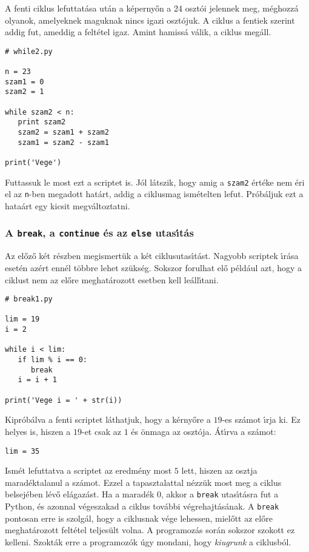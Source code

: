 \documentclass[12pt]{article}
\begin{document}
A fenti ciklus lefuttat\'asa ut\'an a k\'eperny\H{o}n a 24 oszt\'oi jelennek meg, m\'eghozz\'a olyanok, amelyeknek 
maguknak nincs igazi oszt\'ojuk. A ciklus a fentiek szerint addig fut, ameddig a felt\'etel igaz. Amint hamiss\'a 
v\'alik, a ciklus meg\'all. 

\begin{Verbatim}[fontsize=\small]
# while2.py

n = 23
szam1 = 0
szam2 = 1 

while szam2 < n:
   print szam2
   szam2 = szam1 + szam2
   szam1 = szam2 - szam1

print('Vege')
\end{Verbatim}

Futtassuk le most ezt a scriptet is. J\'ol l\'atszik, hogy amig a {\tt szam2} \'ert\'eke nem \'eri el az 
{\tt n}-ben megadott hat\'art, addig a ciklusmag ism\'etelten lefut. Pr\'ob\'aljuk ezt a hata\'art egy 
kicsit megv\'altoztatni.

\subsubsection{A {\tt break}, a {\tt continue} \'es az {\tt else} utas\'{\i}t\'as}

Az el\H{o}z\H{o} k\'et r\'eszben megismert\"uk a k\'et ciklusutas\'{\i}t\'ast. Nagyobb scriptek \'{\i}r\'asa 
eset\'en az\'ert enn\'el t\"obbre lehet sz\"uks\'eg. Sokszor forulhat el\H{o} p\'eld\'aul azt, hogy a 
ciklust nem az el\H{o}re meghat\'arozott esetben kell le\'all\'{\i}tani. 

\begin{Verbatim}[fontsize=\small]
# break1.py

lim = 19
i = 2

while i < lim:
   if lim % i == 0:
      break
   i = i + 1

print('Vege i = ' + str(i))
\end{Verbatim}

Kipr\'ob\'alva a fenti scriptet l\'athatjuk, hogy a k\'erny\H{o}re a $19$-es sz\'amot \'{\i}rja ki. Ez helyes 
is, hiszen a $19$-et csak az $1$ \'es \"onmaga az oszt\'oja. \'At\'{\i}rva a sz\'amot:

\begin{Verbatim}[fontsize=\small]
lim = 35
\end{Verbatim}

Ism\'et lefuttatva a scriptet az eredm\'eny most $5$ lett, hiszen az osztja marad\'ek\-ta\-la\-nul a sz\'amot. Ezzel 
a tapasztalattal n\'ezz\"uk most meg a ciklus belsej\'eben l\'ev\H{o} el\'agaz\'ast. Ha a marad\'ek 0, akkor a 
{\tt break} utas\'{\i}t\'asra fut a Python, \'es azonnal v\'egeszakad a ciklus tov\'abbi v\'egrehajt\'as\'anak. A 
{\tt break} pontosan erre is szolg\'al, hogy a ciklusnak v\'ege lehessen, miel\H{o}tt az el\H{o}re meghat\'arozott 
felt\'etel teljes\"ult volna. A programoz\'as sor\'an sokszor szokott ez kelleni. Szokt\'ak erre a programoz\'ok 
\'ugy mondani, hogy {\sl kiugrunk} a ciklusb\'ol.
\end{document}
